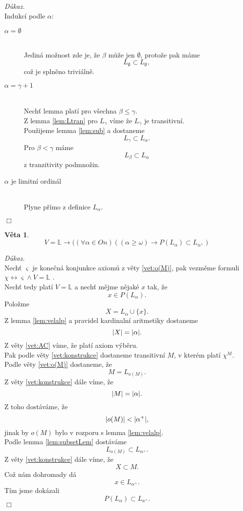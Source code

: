 \documentclass[12pt,a4paper]{article}
\newtheorem{veta}{V\v{e}ta}[section]%
\newenvironment{proof}
{\noindent \textit{D\r{u}kaz.}}
{\hspace*{\fill} $\Box$}
\begin{document}
\begin{proof}~\\
Indukc\'{i} podle $ \alpha $:
\begin{description}
  \item[$ \alpha=\emptyset $]~\\ Jedin\'{a} mo\v{z}nost zde je, \v{z}e $ \beta $ m\r{u}\v{z}e jen $ \emptyset $, proto\v{z}e pak m\'{a}me \[ L_\emptyset \subset L_\emptyset, \] co\v{z} je spln\v{e}no trivi\'{a}ln\v{e}.
  \item[$ \alpha=\gamma +1$]~\\
  Nech\v{t} lemma plat\'{i} pro v\v{s}echna $ \beta \leq \gamma $.\\
  Z lemma \ref{lem:Ltran} pro $ L_\gamma $ v\'{i}me \v{z}e $ L_\gamma $ je transitivn\'{i}. \\
  Pou\v{z}ijeme lemma \ref{lem:sub} a dostaneme\[  L_\gamma \subset L_\alpha .\]
  Pro $ \beta < \gamma $  m\'{a}me \[  L_\beta \subset L_\alpha \] z tranzitivity podmno\v{z}in.
  \item[$ \alpha$ je limitn\'{i} ordin\'{a}l]~\\
  Plyne p\v{r}\'{i}mo z definice $ L_\alpha $.
\end{description}
\end{proof}
\begin{veta}
\label{vet:nasle}
\[ V=\mathbb{L} \rightarrow ((\forall \alpha \in  \textit{On})((\alpha \geq  \omega) \rightarrow P(L_\alpha)\subset L_{\alpha^{+}}) \]
\end{veta}
\begin{proof}~\\
Nech\v{t} $ \varsigma $ je kone\v{c}n\'{a} konjunkce axiom\r{u} z v\v{e}ty \ref{vet:o(M)}, pak vezm\v{e}me formuli $ \chi \leftrightarrow  \varsigma \wedge V=\mathbb{L} $ .\\
Nech\v{t} tedy plat\'{i} $ V=\mathbb{L} $ a nech\v{t} m\v{e}jme n\v{e}jak\'{e} $ x $ tak, \v{z}e \[ x\in P(L_\alpha) .\]
Polo\v{z}me \[ X=L_\alpha \cup \{x\} .\]
Z lemma \ref{lem:velalp} a pravidel kardinaln\'{i} aritmetiky dostaneme 
\[ \arrowvert X \arrowvert=\arrowvert \alpha \arrowvert .\]
Z v\v{e}ty \ref{vet:AC} v\'{i}me, \v{z}e plat\'{i} axiom v\'{y}b\v{e}ru.\\ 
Pak podle v\v{e}ty \ref{vet:konstrukce} dostaneme transitivn\'{i} $ M $, v kter\'{e}m plat\'{i}  $ \chi^M .$\\
Podle v\v{e}ty \ref{vet:o(M)} dostaneme, \v{z}e \[ M=L_{o(M)} .\]
Z v\v{e}ty \ref{vet:konstrukce} d\'{a}le v\'{i}me, \v{z}e
\[ \arrowvert M \arrowvert=\arrowvert \alpha \arrowvert .\]
Z toho dost\'{a}v\'{a}me, \v{z}e   
\[ \arrowvert o(M) \arrowvert <  \arrowvert \alpha^+ \arrowvert , \]
jinak by $ o(M) $ bylo v rozporu s lemma \ref{lem:velalp}. \\
Podle lemma \ref{lem:subsetLem} dost\'{a}v\'{a}me 
\[ L_{o(M)}\subset L_{\alpha^+} .\]
Z v\v{e}ty \ref{vet:konstrukce} d\'{a}le v\'{i}me, \v{z}e \[ X \subset M .\]
Co\v{z} n\'{a}m dohromady d\'{a}  \[ x \in L_{\alpha^+} .\] 
T\'{i}m jsme dok\'{a}zali
\[ P(L_\alpha)\subset L_{a^+} .\]
\end{proof}
\end{document}
